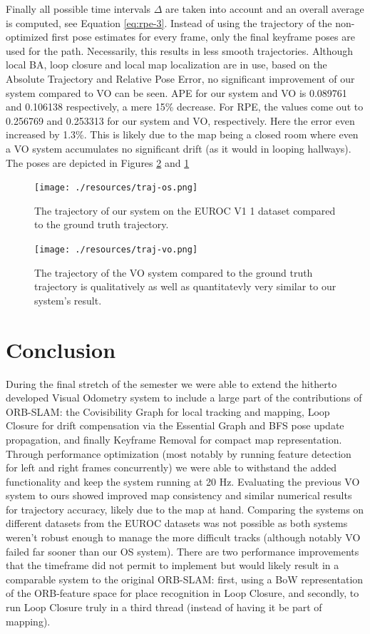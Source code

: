 \documentclass[a4paper, 10pt]{article}
\begin{document}
Finally all possible time intervals \(\Delta\) are taken into account and an overall average is computed, see Equation \ref{eq:rpe-3}.
Instead of using the trajectory of the non-optimized first pose estimates for every frame, only the final keyframe poses are used for the path.
Necessarily, this results in less smooth trajectories. Although local BA, loop closure and local map localization are in use, based on the Absolute Trajectory and Relative Pose Error, no significant improvement of 
our system compared to VO can be seen.
APE for our system and VO is 0.089761 and 0.106138 respectively, a mere 15\% decrease. For RPE, the values come out to 0.256769 and 0.253313 for our system and VO, respectively.
Here the error even increased by 1.3\%.
This is likely due to the map being a closed room where even a VO system accumulates no significant drift (as it would in looping hallways). The poses are depicted in Figures \ref{fig:org9eef79a} and \ref{fig:org7c22fb9}

\begin{figure}[htbp]
\centering
\texttt{[image: ./resources/traj-os.png]}
\caption{\label{fig:org7c22fb9}
The trajectory of our system on the EUROC V1 1 dataset compared to the ground truth trajectory.}
\end{figure}

\begin{figure}[htbp]
\centering
\texttt{[image: ./resources/traj-vo.png]}
\caption{\label{fig:org9eef79a}
The trajectory of the VO system compared to the ground truth trajectory is qualitatively as well as quantitatevly very similar to our system's result.}
\end{figure}

\section{Conclusion}
\label{sec:org31e5883}
During the final stretch of the semester we were able to extend the hitherto developed Visual Odometry system to include a large part of the contributions of ORB-SLAM: the Covisibility Graph for local tracking
and mapping, Loop Closure for drift compensation via the Essential Graph and BFS pose update propagation, and finally Keyframe Removal for compact map representation. Through performance optimization (most notably
by running feature detection for left and right frames concurrently) we were able to withstand the added functionality and keep the system running at 20 Hz. Evaluating the previous VO system to ours showed improved
map consistency and similar numerical results for trajectory accuracy, likely due to the map at hand. Comparing the systems on different datasets from the EUROC datasets was not possible as both systems weren't robust enough
to manage the more difficult tracks (although notably VO failed far sooner than our OS system). There are two performance improvements that the timeframe did not permit to implement but would likely result in a comparable
system to the original ORB-SLAM: first, using a BoW representation of the ORB-feature space for place recognition in Loop Closure, and secondly, to run Loop Closure truly in a third thread (instead of having it be part
of mapping).




\end{document}
